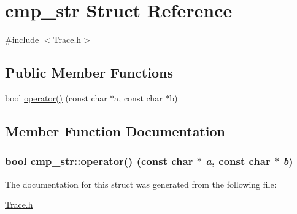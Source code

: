 \hypertarget{structcmp__str}{
\section{cmp\_\-str Struct Reference}
\label{structcmp__str}
}


{\ttfamily \#include $<$Trace.h$>$}\subsection*{Public Member Functions}
\begin{DoxyCompactItemize}
\item 
bool \hyperlink{structcmp__str_a2372a37bf9dcd1b9bcd95583e20cc058}{operator()} (const char $\ast$a, const char $\ast$b)
\end{DoxyCompactItemize}


\subsection{Member Function Documentation}
\hypertarget{structcmp__str_a2372a37bf9dcd1b9bcd95583e20cc058}{
\subsubsection[{operator()}]{\setlength{\rightskip}{0pt plus 5cm}bool cmp\_\-str::operator() (const char $\ast$ {\em a}, \/  const char $\ast$ {\em b})}}
\label{structcmp__str_a2372a37bf9dcd1b9bcd95583e20cc058}


The documentation for this struct was generated from the following file:\begin{DoxyCompactItemize}
\item 
\hyperlink{Trace_8h}{Trace.h}\end{DoxyCompactItemize}

